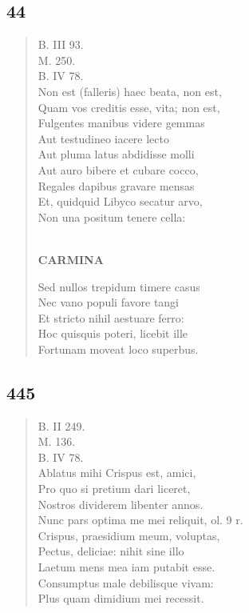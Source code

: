 \documentclass[11pt, a4paper]{report}
\begin{document}
            \subsection*{44}
      \begin{verse}
      B. III 93. \\ M. 250. \\ B. IV 78. \\ Non est (falleris) haec beata, non est, \\ Quam vos creditis esse, vita; non est, \\ Fulgentes manibus videre gemmas \\ Aut testudineo iacere lecto \\ Aut pluma latus abdidisse molli \\ Aut auro bibere et cubare cocco, \\ Regales dapibus gravare mensas \\ Et, quidquid Libyco secatur arvo, \\ Non una positum tenere cella: \\ 
        ﻿\pagebreak 
    \begin{center} \textbf{CARMINA} \end{center} \marginpar{[334]} Sed nullos trepidum timere casus \\ Nec vano populi favore tangi \\ Et stricto nihil aestuare ferro: \\ Hoc quisquis poteri, licebit ille \\ Fortunam moveat loco superbus. \\ 
      \end{verse}
  
            \subsection*{445}
      \begin{verse}
      B. II 249. \\ M. 136. \\ B. IV 78. \\ Ablatus mihi Crispus est, amici, \\ Pro quo si pretium dari liceret, \\ Nostros dividerem libenter annos. \\ Nunc pars optima me mei reliquit, ol. 9 r. \\ Crispus, praesidium meum, voluptas, \\ Pectus, deliciae: nihit sine illo \\ Laetum mens mea iam putabit esse. \\ Consumptus male debilisque vivam: \\ Plus quam dimidium mei recessit. \\ 
      \end{verse}
  
\end{document}
